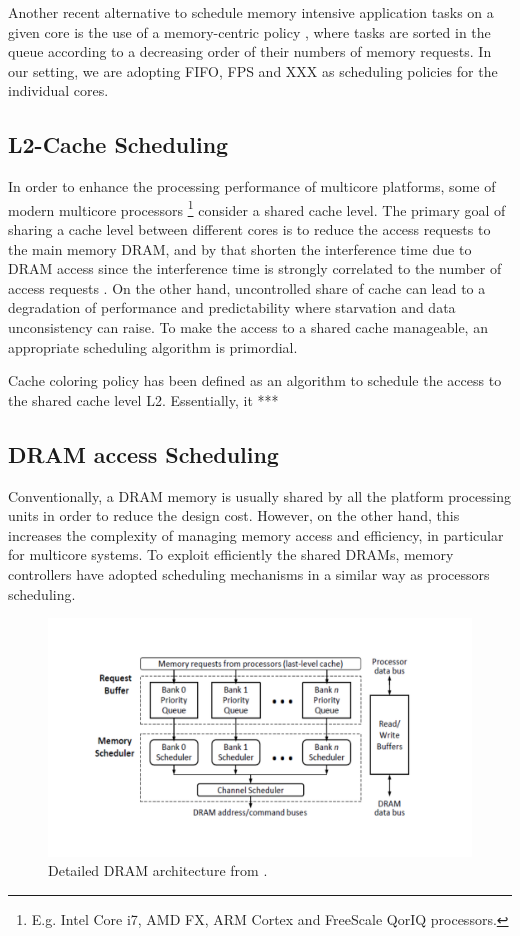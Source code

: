 Another recent alternative to schedule memory intensive application tasks on a given core is the use of a memory-centric policy \cite{Yao2015,Yao2012}, where tasks are sorted in the queue according to a decreasing order of their numbers of memory requests.
In our setting, we are adopting FIFO, FPS and XXX as scheduling policies for the individual cores.    

\subsection{L2-Cache Scheduling}
In order to enhance the processing performance of multicore platforms, some of modern multicore processors \footnote{E.g. {Intel Core i7, AMD FX, ARM Cortex and FreeScale QorIQ} processors.} consider a shared cache level. The primary goal of sharing a cache level between different cores is to reduce the access requests to the main memory DRAM, and by that shorten the interference time due to DRAM access since the interference time is strongly correlated to the number of access requests \cite{Nowotsch14}. On the other hand, uncontrolled share of cache can lead to a degradation of performance and  predictability where starvation and data unconsistency can raise. To make the access to a shared cache manageable, an appropriate scheduling algorithm is primordial.

Cache coloring policy \cite{Hyoseung13} has been defined as an algorithm to schedule the access to the shared cache level L2.  
Essentially, it ***
 
\subsection{DRAM access Scheduling} 
Conventionally, a DRAM memory is usually shared by all the platform processing units in order to reduce the design cost. However, on the other hand, this increases the complexity of managing memory access and efficiency, in particular for multicore systems.  
To exploit efficiently the shared DRAMs, memory controllers have adopted scheduling mechanisms in a similar way as processors scheduling.

\begin{figure}[ht!]
\caption{Detailed DRAM architecture from \cite{Kim14}.}
\includegraphics[scale=0.55]{dram-architecture.pdf}
\end{figure}

